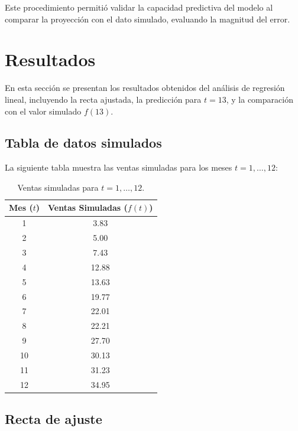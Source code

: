 \documentclass[a4paper,12pt]{article}
\begin{document}
Este procedimiento permitió validar la capacidad predictiva del modelo al comparar la proyección con el dato simulado, evaluando la magnitud del error.

\section{Resultados}

En esta sección se presentan los resultados obtenidos del análisis de regresión lineal, incluyendo la recta ajustada, la predicción para \( t = 13 \), y la comparación con el valor simulado \( f(13) \).

\subsection{Tabla de datos simulados}

La siguiente tabla muestra las ventas simuladas para los meses \( t = 1, \ldots, 12 \):

\begin{table}[H]
    \centering
    \begin{tabular}{|c|c|}
        \hline
        \textbf{Mes (\( t \))} & \textbf{Ventas Simuladas (\( f(t) \))} \\ \hline
        1  & 3.83 \\ \hline
        2  & 5.00 \\ \hline
        3  & 7.43 \\ \hline
        4  & 12.88 \\ \hline
        5  & 13.63 \\ \hline
        6  & 19.77 \\ \hline
        7  & 22.01 \\ \hline
        8  & 22.21 \\ \hline
        9  & 27.70 \\ \hline
        10 & 30.13 \\ \hline
        11 & 31.23 \\ \hline
        12 & 34.95 \\ \hline
    \end{tabular}
    \caption{Ventas simuladas para \( t = 1, \ldots, 12 \).}
    \label{tab:ventas_simuladas}
\end{table}

\subsection{Recta de ajuste}
\end{document}
